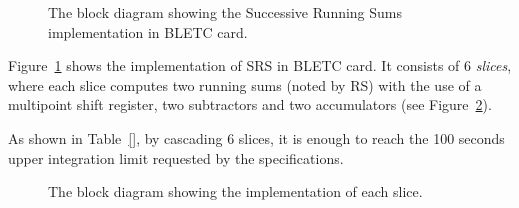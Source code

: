 \documentclass{llncs}
\begin{document}
\begin{figure}[t]
  \centering {}
   \caption{The block diagram showing the Successive Running Sums implementation in BLETC card.}
  \label{fig:srs}
\end{figure}


Figure~\ref{fig:srs} shows the implementation of SRS in BLETC card. It consists of 6 \emph{slices}, where each slice computes two running sums (noted by RS) with the use of a multipoint shift register, two subtractors and two accumulators (see Figure~\ref{fig:slice}).

As shown in Table~\ref{}, by cascading 6 slices, it is enough to reach the 100 seconds upper integration limit requested by the specifications.

\begin{figure}[t]
  \centering {}
   \caption{The block diagram showing the implementation of each slice.}
  \label{fig:slice}
\end{figure}
\end{document}
